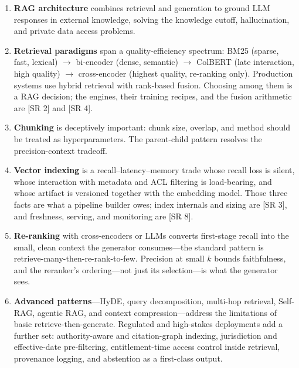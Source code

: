 \begin{enumerate}
    \item \textbf{RAG architecture} combines retrieval and generation to ground
          LLM responses in external knowledge, solving the knowledge cutoff,
          hallucination, and private data access problems.

    \item \textbf{Retrieval paradigms} span a quality-efficiency spectrum:
          BM25 (sparse, fast, lexical) $\to$ bi-encoder (dense, semantic) $\to$
          ColBERT (late interaction, high quality) $\to$ cross-encoder (highest
          quality, re-ranking only).  Production systems use hybrid retrieval
          with rank-based fusion.  Choosing among them is a RAG decision; the
          engines, their training recipes, and the fusion arithmetic are
          [SR 2] and [SR 4].

    \item \textbf{Chunking} is deceptively important: chunk size, overlap, and
          method should be treated as hyperparameters.  The parent-child
          pattern resolves the precision-context tradeoff.

    \item \textbf{Vector indexing} is a recall--latency--memory trade whose
          recall loss is silent, whose interaction with metadata and ACL
          filtering is load-bearing, and whose artifact is versioned together
          with the embedding model.  Those three facts are what a pipeline
          builder owes; index internals and sizing are [SR 3], and freshness,
          serving, and monitoring are [SR 8].

    \item \textbf{Re-ranking} with cross-encoders or LLMs converts first-stage
          recall into the small, clean context the generator consumes---the
          standard pattern is retrieve-many-then-re-rank-to-few.  Precision
          at small $k$ bounds faithfulness, and the reranker's ordering---not
          just its selection---is what the generator sees.

    \item \textbf{Advanced patterns}---HyDE, query decomposition, multi-hop
          retrieval, Self-RAG, agentic RAG, and context compression---address
          the limitations of basic retrieve-then-generate.  Regulated and
          high-stakes deployments add a further set: authority-aware and
          citation-graph indexing, jurisdiction and effective-date
          pre-filtering, entitlement-time access control inside retrieval,
          provenance logging, and abstention as a first-class output.


\end{enumerate}
